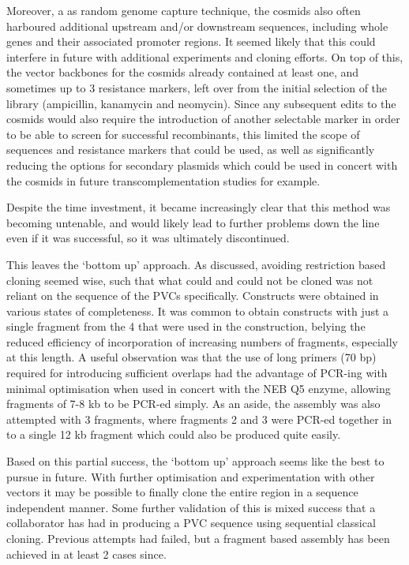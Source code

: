 Moreover, a as random genome capture technique, the cosmids also often harboured additional upstream and/or downstream sequences, including whole genes and their associated promoter regions. It seemed likely that this could interfere in future with additional experiments and cloning efforts. On top of this, the vector backbones for the cosmids already contained at least one, and sometimes up to 3 resistance markers, left over from the initial selection of the library (ampicillin, kanamycin and neomycin). Since any subsequent edits to the cosmids would also require the introduction of another selectable marker in order to be able to screen for successful recombinants, this limited the scope of sequences and resistance markers that could be used, as well as significantly reducing the options for secondary plasmids which could be used in concert with the cosmids in future transcomplementation studies for example.

Despite the time investment, it became increasingly clear that this method was becoming untenable, and would likely lead to further problems down the line even if it was successful, so it was ultimately discontinued.

This leaves the `bottom up' approach. As discussed, avoiding restriction based cloning seemed wise, such that what could and could not be cloned was not reliant on the sequence of the PVCs specifically. Constructs were obtained in various states of completeness. It was common to obtain constructs with just a single fragment from the 4 that were used in the construction, belying the reduced efficiency of incorporation of increasing numbers of fragments, especially at this length. A useful observation was that the use of long primers (70 bp) required for introducing sufficient overlaps had the advantage of PCR-ing with minimal optimisation when used in concert with the NEB Q5 enzyme, allowing fragments of 7-8 kb to be PCR-ed simply. As an aside, the assembly was also attempted with 3 fragments, where fragments 2 and 3 were PCR-ed together in to a single 12 kb fragment which could also be produced quite easily.

Based on this partial success, the `bottom up' approach seems like the best to pursue in future. With further optimisation and experimentation with other vectors it may be possible to finally clone the entire region in a sequence independent manner. Some further validation of this is mixed success that a collaborator has had in producing a PVC sequence using sequential classical cloning. Previous attempts had failed, but a fragment based assembly has been achieved in at least 2 cases since.



